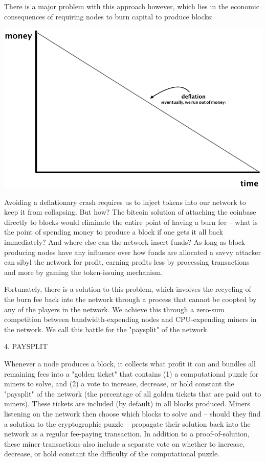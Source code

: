 \documentclass[11.5pt, oneside]{article}   	%
\begin{document}
\begin{multicols}{2}
There is a major problem with this approach however, which lies in the economic consequences of requiring nodes to burn capital to produce blocks:

\includegraphics[width=.45\textwidth]{saito4.jpeg}

Avoiding a deflationary crash requires us to inject tokens into our network to keep it from collapsing. But how? The bitcoin solution of attaching the coinbase directly to blocks would eliminate the entire point of having a burn fee -- what is the point of spending money to produce a block if one gets it all back immediately? And where else can the network insert funds? As long as block-producing nodes have any influence over how funds are allocated a savvy attacker can sibyl the network for profit, earning profits less by processing transactions and more by gaming the token-issuing mechanism.

Fortunately, there is a solution to this problem, which involves the recycling of the burn fee back into the network through a process that cannot be coopted by any of the players in the network. We achieve this through a zero-sum competition between bandwidth-expending nodes and CPU-expending miners in the network. We call this battle for the "paysplit" of the network.

4. PAYSPLIT

Whenever a node produces a block, it collects what profit it can and bundles all remaining fees into a "golden ticket" that contains (1) a computational puzzle for miners to solve, and (2) a vote to increase, decrease, or hold constant the "paysplit" of the network (the percentage of all golden tickets that are paid out to miners). These tickets are included (by default) in all blocks produced. Miners listening on the network then choose which blocks to solve and -- should they find a solution to the cryptographic puzzle -- propagate their solution back into the network as a regular fee-paying transaction. In addition to a proof-of-solution, these miner transactions also include a separate vote on whether to increase, decrease, or hold constant the difficulty of the computational puzzle.


\end{multicols}
\end{document}
